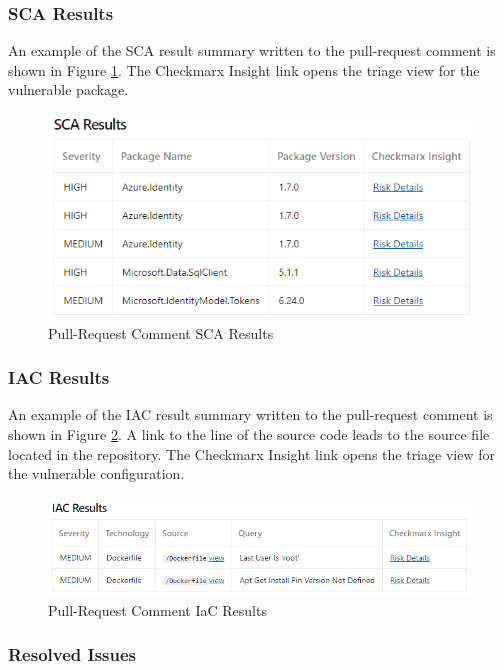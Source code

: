 \subsubsection{SCA Results}

An example of the SCA result summary written to the pull-request comment
is shown in Figure
\ref{fig:pr-sca-section}.  The Checkmarx Insight link opens the triage view 
for the vulnerable package. 

\begin{figure}[ht]
    \includegraphics[width=\textwidth]{graphics/pr-sca.png}
    \caption{Pull-Request Comment SCA Results}
    \label{fig:pr-sca-section}
\end{figure}

\subsubsection{IAC Results}

An example of the IAC result summary written to the pull-request comment
is shown in Figure
\ref{fig:pr-iac-section}. A
link to the line of the source code leads to the source file located in the
repository.  The Checkmarx Insight link opens the triage view for the vulnerable
configuration.

\begin{figure}[ht]
    \includegraphics[width=\textwidth]{graphics/pr-iac.png}
    \caption{Pull-Request Comment IaC Results}
    \label{fig:pr-iac-section}
\end{figure}

\subsubsection{Resolved Issues}

